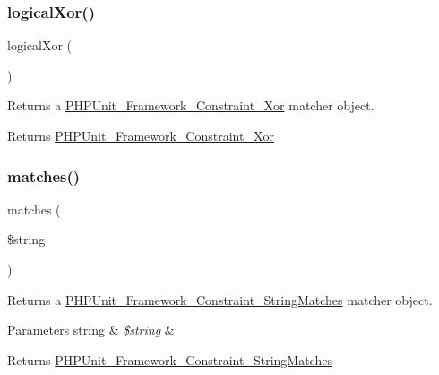 \subsubsection{\texorpdfstring{logical\+Xor()}{logicalXor()}}
{\footnotesize\ttfamily logical\+Xor (\begin{DoxyParamCaption}{ }\end{DoxyParamCaption})}

Returns a \mbox{\hyperlink{class_p_h_p_unit___framework___constraint___xor}{P\+H\+P\+Unit\+\_\+\+Framework\+\_\+\+Constraint\+\_\+\+Xor}} matcher object.

\begin{DoxyReturn}{Returns}
\mbox{\hyperlink{class_p_h_p_unit___framework___constraint___xor}{P\+H\+P\+Unit\+\_\+\+Framework\+\_\+\+Constraint\+\_\+\+Xor}} 
\end{DoxyReturn}
\mbox{\label{_functions_8php_a8968a55c84671473daa2233e6cae65b8}} 
\subsubsection{\texorpdfstring{matches()}{matches()}}
{\footnotesize\ttfamily matches (\begin{DoxyParamCaption}\item[{}]{\$string }\end{DoxyParamCaption})}

Returns a \mbox{\hyperlink{class_p_h_p_unit___framework___constraint___string_matches}{P\+H\+P\+Unit\+\_\+\+Framework\+\_\+\+Constraint\+\_\+\+String\+Matches}} matcher object.


\begin{DoxyParams}[1]{Parameters}
string & {\em \$string} & \\
\hline
\end{DoxyParams}
\begin{DoxyReturn}{Returns}
\mbox{\hyperlink{class_p_h_p_unit___framework___constraint___string_matches}{P\+H\+P\+Unit\+\_\+\+Framework\+\_\+\+Constraint\+\_\+\+String\+Matches}} 
\end{DoxyReturn}
\mbox{\label{_functions_8php_af2ef74284024d6308cd69bc4a2ce2df4}} 
